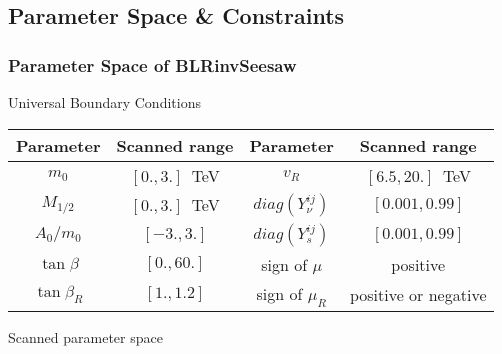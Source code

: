 \documentclass[hyperref={bookmarks=false},aspectratio=169]{beamer}
\begin{document}

\subsection{Parameter Space \& Constraints}


\begin{frame}
\frametitle{Parameter Space of BLRinvSeesaw}
\color{red}
\centering
Universal Boundary Conditions
\pause
\begin{table}
	\color{black}
	\setlength\tabcolsep{7pt}
	\renewcommand{\arraystretch}{1.4}
	\begin{tabular}{c|c||c|c}
		Parameter      & Scanned range& Parameter      & Scanned range\\
		\hline
		$m_0$          & $[0., 3.]$~TeV   & $v_{R}$               & $[6.5, 20.]$~TeV\\
		$M_{1/2}$      & $[0., 3.]$~TeV   & $diag(Y_{\nu}^{ij})$  & $[0.001, 0.99]$\\
		$A_0/m_0$      & $[-3., 3.]$      & $diag(Y_{s}^{ij})$    & $[0.001, 0.99]$\\
		$\tan\beta$    & $[0., 60.]$      & {\rm sign of} $\mu$   & {\rm positive} \\
		$\tan\beta_R$  & $[1., 1.2]$    & {\rm sign of} $\mu_R$ & {\rm positive or negative} \\ 
	\end{tabular}
	\end{table}
Scanned parameter space
\end{frame}







\end{document}
